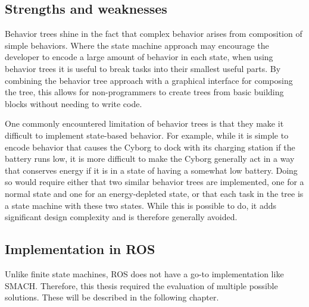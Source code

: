 \documentclass[\rootfolder/main.tex]{subfiles}
\begin{document}
\subsection{Strengths and weaknesses}

Behavior trees shine in the fact that complex behavior arises from composition of simple behaviors.
Where the state machine approach may encourage the developer to encode a large amount of behavior in each state, when using behavior trees it is useful to break tasks into their smallest useful parts.
By combining the behavior tree approach with a graphical interface for composing the tree, this allows for non-programmers to create trees from basic building blocks without needing to write code.

One commonly encountered limitation of behavior trees is that they make it difficult to implement state-based behavior.
For example, while it is simple to encode behavior that causes the Cyborg to dock with its charging station if the battery runs low, it is more difficult to make the Cyborg generally act in a way that conserves energy if it is in a state of having a somewhat low battery.
Doing so would require either that two similar behavior trees are implemented, one for a normal state and one for an energy-depleted state, or that each task in the tree is a state machine with these two states.
While this is possible to do, it adds significant design complexity and is therefore generally avoided.


\subsection{Implementation in ROS}

Unlike finite state machines, ROS does not have a go-to implementation like SMACH.
Therefore, this thesis required the evaluation of multiple possible solutions.
These will be described in the following chapter.


\end{document}
